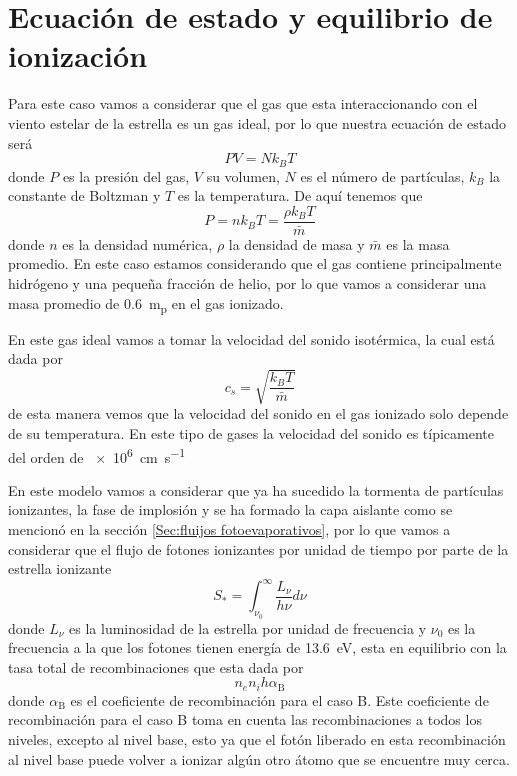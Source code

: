 \documentclass{book}
\begin{document}

\section{Ecuación de estado y equilibrio de ionización}

Para este caso vamos a considerar que el gas que esta interaccionando con el viento estelar de la estrella es un gas ideal, por lo que nuestra ecuación de estado será
\begin{equation}
    PV = Nk_BT
\end{equation} 
donde $P$ es la presión del gas, $V$ su volumen, $N$ es el número de partículas, $k_B$ la constante de Boltzman y $T$ es la temperatura. De aquí tenemos que \begin{equation}
    P = nk_BT = \frac{\rho k_B T}{\bar{m}}
\end{equation}
donde $n$ es la densidad numérica, $\rho$ la densidad de masa y $\bar{m}$ es la masa promedio. En este caso estamos considerando que el gas contiene principalmente hidrógeno y una pequeña fracción de helio, por lo que vamos a considerar una masa promedio de \SI{0.6}{m_{p}} en el gas ionizado.

En este gas ideal vamos a tomar la velocidad del sonido isotérmica, la cual está dada por
\begin{equation}
    c_s  = \sqrt{\frac{k_B T}{\bar{m}}}
\end{equation} 
de esta manera vemos que la velocidad del sonido en el gas ionizado solo depende de su temperatura. En este tipo de gases la velocidad del sonido es típicamente del orden de \SI{e6}{cm.s^{-1}}

En este modelo vamos a considerar que  ya ha sucedido la tormenta de partículas ionizantes, la fase de implosión y se ha formado la capa aislante como se mencionó en la sección \ref{Sec:fluijos fotoevaporativos}, por lo que vamos a considerar que el flujo de fotones ionizantes por unidad de tiempo por parte de la estrella ionizante 
\begin{equation}
    S_* = \int_{\nu_0}^\infty \frac{L_\nu}{h\nu}d\nu
\end{equation} 
donde $L_\nu$ es la luminosidad de la estrella por unidad de frecuencia y $\nu_0$ es la frecuencia a la que los fotones tienen energía de \SI{13.6}{eV}, esta en equilibrio con la tasa total de recombinaciones que esta dada por 
\[n_e n_i h \alpha_\mathrm{B}\] 
donde $\alpha_\mathrm{B}$ es el coeficiente de recombinación para el caso B. Este coeficiente de recombinación para el caso B toma en cuenta las recombinaciones a todos los niveles, excepto al nivel base, esto ya que el fotón liberado en esta recombinación al nivel base puede volver a ionizar algún otro átomo que se encuentre muy cerca. 
\end{document}
